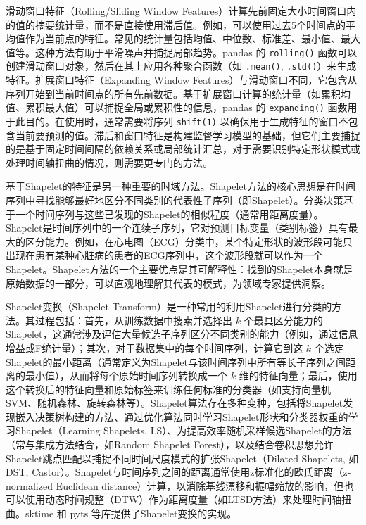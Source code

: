 滑动窗口特征（Rolling/Sliding Window Features）\cite{3}计算先前固定大小时间窗口内的值的摘要统计量，而不是直接使用滞后值。例如，可以使用过去5个时间点的平均值作为当前点的特征。常见的统计量包括均值、中位数、标准差、最小值、最大值等。这种方法有助于平滑噪声并捕捉局部趋势。pandas 的 \texttt{rolling()} 函数可以创建滑动窗口对象，然后在其上应用各种聚合函数（如 \texttt{.mean()}, \texttt{.std()}）来生成特征。扩展窗口特征（Expanding Window Features）与滑动窗口不同，它包含从序列开始到当前时间点的所有先前数据。基于扩展窗口计算的统计量（如累积均值、累积最大值）可以捕捉全局或累积性的信息，pandas 的 \texttt{expanding()} 函数用于此目的。在使用时，通常需要将序列 \texttt{shift(1)} 以确保用于生成特征的窗口不包含当前要预测的值。滞后和窗口特征是构建监督学习模型的基础，但它们主要捕捉的是基于固定时间间隔的依赖关系或局部统计汇总，对于需要识别特定形状模式或处理时间轴扭曲的情况，则需要更专门的方法。

基于Shapelet的特征是另一种重要的时域方法。Shapelet方法的核心思想是在时间序列中寻找能够最好地区分不同类别的代表性子序列（即Shapelet）。分类决策基于一个时间序列与这些已发现的Shapelet的相似程度（通常用距离度量）。Shapelet是时间序列中的一个连续子序列，它对预测目标变量（类别标签）具有最大的区分能力。例如，在心电图（ECG）分类中，某个特定形状的波形段可能只出现在患有某种心脏病的患者的ECG序列中，这个波形段就可以作为一个Shapelet。Shapelet方法的一个主要优点是其可解释性：找到的Shapelet本身就是原始数据的一部分，可以直观地理解其代表的模式，为领域专家提供洞察。

Shapelet变换（Shapelet Transform）是一种常用的利用Shapelet进行分类的方法。其过程包括：首先，从训练数据中搜索并选择出 $k$ 个最具区分能力的Shapelet，这通常涉及评估大量候选子序列区分不同类别的能力（例如，通过信息增益或F统计量）；其次，对于数据集中的每个时间序列，计算它到这 $k$ 个选定Shapelet的最小距离（通常定义为Shapelet与该时间序列中所有等长子序列之间距离的最小值），从而将每个原始时间序列转换成一个 $k$ 维的特征向量；最后，使用这个转换后的特征向量和原始标签来训练任何标准的分类器（如支持向量机SVM、随机森林、旋转森林等）。Shapelet算法存在多种变种，包括将Shapelet发现嵌入决策树构建的方法、通过优化算法同时学习Shapelet形状和分类器权重的学习Shapelet（Learning Shapelets, LS）、为提高效率随机采样候选Shapelet的方法（常与集成方法结合，如Random Shapelet Forest），以及结合卷积思想允许Shapelet跳点匹配以捕捉不同时间尺度模式的扩张Shapelet（Dilated Shapelets, 如DST, Castor）。Shapelet与时间序列之间的距离通常使用z标准化的欧氏距离（z-normalized Euclidean distance）计算，以消除基线漂移和振幅缩放的影响，但也可以使用动态时间规整（DTW）作为距离度量（如LTSD方法）来处理时间轴扭曲。sktime 和 pyts 等库提供了Shapelet变换的实现。

